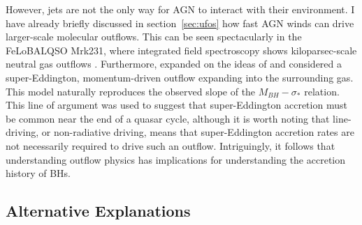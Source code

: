 
However, jets are not the only way for AGN to interact with 
their environment. I have already briefly discussed in section~\ref{sec:ufos}
how fast AGN winds can drive larger-scale molecular outflows.
This can be seen spectacularly in the FeLoBALQSO Mrk231,
where integrated field spectroscopy shows kiloparsec-scale
neutral gas outflows \citep{rupke2011}.
Furthermore, \cite{king2003} expanded on the ideas of \cite{silkrees1998} and
considered a super-Eddington, momentum-driven outflow expanding into the surrounding gas. 
This model naturally reproduces the observed slope of the $M_{BH}-\sigma_*$
relation. This line of argument was used to suggest that super-Eddington accretion must be
common near the end of a quasar cycle, although it is worth noting that line-driving,
or non-radiative driving, means that super-Eddington accretion rates are 
not necessarily required to drive such an outflow. Intriguingly, it follows that 
understanding outflow physics has implications for understanding 
the accretion history of BHs.



\subsection{Alternative Explanations}

